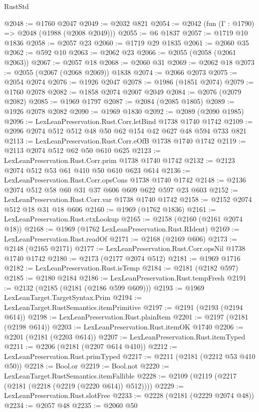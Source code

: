 \begin{lexlean}{RustStd}
\begin{coremodule}
@2048 := @1760 @2047
@2049 := @2032 @821
@2054 := @2042 (fun (Γ : @1790) => @2048 (@1988 (@2008 @2049)))
@2055 := @6 @1837
@2057 := @1719 @10 @1836
@2058 := @2057 @23
@2060 := @1719 @29 @1835
@2061 := @2060 @35
@2062 := @592 @10
@2063 := @2062 @23
@2066 := @2055 (@2058 (@2061 @2063))
@2067 := @2057 @18
@2068 := @2060 @31
@2069 := @2062 @18
@2073 := @2055 (@2067 (@2068 @2069)) @1838
@2074 := @2066 @2073
@2075 := @2054 @2074
@2076 := @1926 @2047
@2078 := @1986 (@1851 @2074)
@2079 := @1760 @2078
@2082 := @1858 @2074 @2007 @2049
@2084 := @2076 (@2079 @2082)
@2085 := @1969 @1797
@2087 := @2084 (@2085 @1805)
@2089 := @1926 @2078 @2082
@2090 := @1969 @1830
@2092 := @2089 (@2090 @1985)
@2096 := LexLeanPreservation.Rust.Corr.letBind @1738 @1740 @1742
@2109 := @2096 @2074 @512 @512 @48 @50 @62 @154 @42 @627 @48 @594 @733 @821
@2113 := LexLeanPreservation.Rust.Corr.eOfB @1738 @1740 @1742
@2119 := @2113 @2074 @512 @62 @50 @610 @625
@2123 := LexLeanPreservation.Rust.Corr.prim @1738 @1740 @1742
@2132 := @2123 @2074 @512 @53 @61 @410 @50 @610 @623 @614
@2136 := LexLeanPreservation.Rust.Corr.opsCons @1738 @1740 @1742
@2148 := @2136 @2074 @512 @58 @60 @31 @37 @606 @609 @622 @597 @23 @603
@2152 := LexLeanPreservation.Rust.Corr.var @1738 @1740 @1742
@2158 := @2152 @2074 @512 @18 @31 @18 @606
@2160 := @1969 (@1762 @1836)
@2161 := LexLeanPreservation.Rust.ctxLookup
@2165 := @2158 (@2160 (@2161 @2074 @18))
@2168 := @1969 (@1762 LexLeanPreservation.Rust.RIdent)
@2169 := LexLeanPreservation.Rust.readOf
@2171 := @2168 (@2169 @606)
@2173 := @2148 (@2165 @2171)
@2177 := LexLeanPreservation.Rust.Corr.opsNil @1738 @1740 @1742
@2180 := @2173 (@2177 @2074 @512)
@2181 := @1969 @1716
@2182 := LexLeanPreservation.Rust.isTemp
@2184 := @2181 (@2182 @597)
@2185 := @2180 @2184
@2186 := LexLeanPreservation.Rust.tempFresh
@2191 := @2132 (@2185 (@2181 (@2186 @599 @609)))
@2193 := @1969 LexLeanTarget.TargetSyntax.Prim
@2194 := LexLeanTarget.RustSemantics.itemPrimitive
@2197 := @2191 (@2193 (@2194 @614))
@2198 := LexLeanPreservation.Rust.plainItem
@2201 := @2197 (@2181 (@2198 @614))
@2203 := LexLeanPreservation.Rust.itemOK @1740
@2206 := @2201 (@2181 (@2203 @614))
@2207 := LexLeanPreservation.Rust.itemTyped
@2211 := @2206 (@2181 (@2207 @614 @410))
@2212 := LexLeanPreservation.Rust.primTyped
@2217 := @2211 (@2181 (@2212 @53 @410 @50))
@2218 := Bool.or
@2219 := Bool.not
@2220 := LexLeanTarget.RustSemantics.itemFallible
@2228 := @2109 (@2119 (@2217 (@2181 (@2218 (@2219 (@2220 @614)) @512))))
@2229 := LexLeanPreservation.Rust.slotFree
@2233 := @2228 (@2181 (@2229 @2074 @48))
@2234 := @2057 @48
@2235 := @2060 @50

\end{coremodule}
\end{lexlean}
